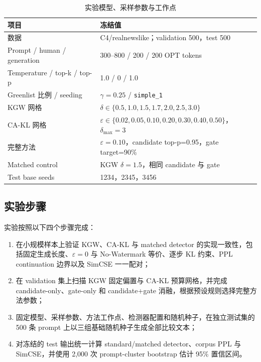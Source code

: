 \documentclass[a4paper,UTF8,zihao=5]{ctexart}
\newcommand{\cakl}{CA-KL}
\begin{document}
\begin{table}[H]
    \centering
    \caption{实验模型、采样参数与工作点}
    \label{tab:config}
    \small
    \begin{tabular}{ll}
        \toprule
        项目                          & 冻结值                                                                      \\
        \midrule
        数据                          & C4/realnewslike；validation 500，test 500                                  \\
        Prompt / human / generation & 300--800 / 200 / 200 OPT tokens                                          \\
        Temperature / top-k / top-p & 1.0 / 0 / 1.0                                                            \\
        Greenlist 比例 / seeding      & $\gamma=0.25$ / \texttt{simple\_1}                                       \\
        KGW 网格                      & $\delta\in\{0.5,1.0,1.5,1.7,2.0,2.5,3.0\}$                               \\
        \cakl{} 网格                  & $\varepsilon\in\{0.02,0.05,0.10,0.20,0.30,0.40,0.50\}$，$\delta_{\max}=3$ \\
        完整方法                        & $\varepsilon=0.10$，candidate top-p=0.95，gate target=90\%                 \\
        Matched control             & KGW $\delta=1.5$，相同 candidate 与 gate                                     \\
        Test base seeds             & 1234，2345，3456                                                           \\
        \bottomrule
    \end{tabular}
\end{table}

\subsection{实验步骤}

实验按照以下四个步骤完成：

\begin{enumerate}
    \item 在小规模样本上验证 KGW、\cakl{} 与 matched detector 的实现一致性，包括固定生成长度、$\varepsilon=0$ 与 No-Watermark 等价、逐步 KL 约束、PPL continuation 边界以及 SimCSE 一一配对；
    \item 在 validation 集上扫描 KGW 固定偏置与 \cakl{} 预算网格，并完成 candidate-only、gate-only 和 candidate+gate 消融，根据预设规则选择完整方法参数；
    \item 固定模型、采样参数、方法工作点、检测器配置和随机种子，在独立测试集的 500 条 prompt 上以三组基础随机种子生成全部比较文本；
    \item 对冻结的 test 输出统一计算 standard/matched detector、corpus PPL 与 SimCSE，并使用 2,000 次 prompt-cluster bootstrap 估计 95\% 置信区间。
\end{enumerate}
\end{document}

